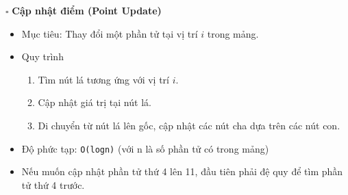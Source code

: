 \documentclass[a4paper]{article}
\begin{document}
\noindent $\square$ \textbf{Cập nhật điểm (Point Update)}
\begin{itemize}[label = $\circ$]
    \item Mục tiêu: Thay đổi một phần tử tại vị trí $i$ trong mảng.
    \item Quy trình
    \begin{enumerate}
        \item Tìm nút lá tương ứng với vị trí $i$.
        \item Cập nhật giá trị tại nút lá.
        \item Di chuyển từ nút lá lên gốc, cập nhật các nút cha dựa trên các nút con.
    \end{enumerate}
    \item Độ phức tạp: \texttt{O(logn)} (với n là số phần tử có trong mảng)
    \item Nếu muốn cập nhật phần tử thứ 4 lên 11, đầu tiên phải đệ quy để tìm phần tử thứ 4 trước.
    \begin{table}[tbh!]
        \large
        \begin{minipage}[t]{1.6in}
        \end{minipage}
        \begin{minipage}[c]{0.5in}
            \begin{center}
            \end{center}
        \end{minipage}
        \begin{minipage}[t]{1.6in}
\end{minipage}
\end{table}
\end{itemize}
\end{document}
